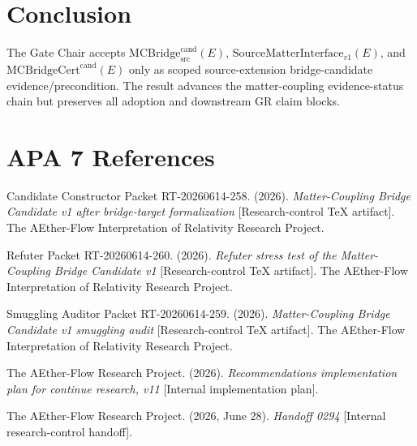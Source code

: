 \documentclass[11pt]{article}
\newcommand{\MCBridgeCand}{\mathrm{MCBridge}_{\mathrm{src}}^{\mathrm{cand}}}
\newcommand{\MCBridgeCertCand}{\mathrm{MCBridgeCert}^{\mathrm{cand}}}
\newcommand{\SMI}{\mathrm{SourceMatterInterface}_{v1}}
\begin{document}
\section{Conclusion}

The Gate Chair accepts \(\MCBridgeCand(E)\), \(\SMI(E)\), and
\(\MCBridgeCertCand(E)\) only as scoped source-extension bridge-candidate
evidence/precondition. The result advances the matter-coupling evidence-status
chain but preserves all adoption and downstream GR claim blocks.

\section{APA 7 References}

Candidate Constructor Packet RT-20260614-258. (2026). \textit{Matter-Coupling
Bridge Candidate v1 after bridge-target formalization} [Research-control TeX
artifact]. The AEther-Flow Interpretation of Relativity Research Project.

Refuter Packet RT-20260614-260. (2026). \textit{Refuter stress test of the
Matter-Coupling Bridge Candidate v1} [Research-control TeX artifact]. The
AEther-Flow Interpretation of Relativity Research Project.

Smuggling Auditor Packet RT-20260614-259. (2026). \textit{Matter-Coupling
Bridge Candidate v1 smuggling audit} [Research-control TeX artifact]. The
AEther-Flow Interpretation of Relativity Research Project.

The AEther-Flow Research Project. (2026). \textit{Recommendations
implementation plan for continue research, v11} [Internal implementation
plan].

The AEther-Flow Research Project. (2026, June 28). \textit{Handoff 0294}
[Internal research-control handoff].
\end{document}
